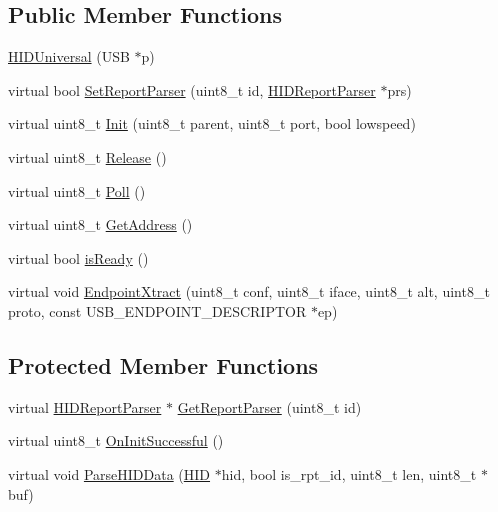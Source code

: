 \subsection*{\-Public \-Member \-Functions}
\begin{DoxyCompactItemize}
\item 
\hyperlink{class_h_i_d_universal_abdbac688c7e4b682055cebd82e13a595}{\-H\-I\-D\-Universal} (\-U\-S\-B $\ast$p)
\item 
virtual bool \hyperlink{class_h_i_d_universal_afbd599879e9c3cdea382e87afd6ab29a}{\-Set\-Report\-Parser} (uint8\-\_\-t id, \hyperlink{class_h_i_d_report_parser}{\-H\-I\-D\-Report\-Parser} $\ast$prs)
\item 
virtual uint8\-\_\-t \hyperlink{class_h_i_d_universal_a384b0e219f763e2d6407636bfd4ccea7}{\-Init} (uint8\-\_\-t parent, uint8\-\_\-t port, bool lowspeed)
\item 
virtual uint8\-\_\-t \hyperlink{class_h_i_d_universal_af999fc50ef4b5dec0391bda79ec83bda}{\-Release} ()
\item 
virtual uint8\-\_\-t \hyperlink{class_h_i_d_universal_ac27e857a0d9619c8abc31be0b690c83c}{\-Poll} ()
\item 
virtual uint8\-\_\-t \hyperlink{class_h_i_d_universal_abcc6921b7beaf0aac2acbcdddd535626}{\-Get\-Address} ()
\item 
virtual bool \hyperlink{class_h_i_d_universal_aa4be95e8f5164393ea4766f68c5b0ea8}{is\-Ready} ()
\item 
virtual void \hyperlink{class_h_i_d_universal_ab9b13f27eca16e0accc14fff9bd318e2}{\-Endpoint\-Xtract} (uint8\-\_\-t conf, uint8\-\_\-t iface, uint8\-\_\-t alt, uint8\-\_\-t proto, const \-U\-S\-B\-\_\-\-E\-N\-D\-P\-O\-I\-N\-T\-\_\-\-D\-E\-S\-C\-R\-I\-P\-T\-O\-R $\ast$ep)
\end{DoxyCompactItemize}
\subsection*{\-Protected \-Member \-Functions}
\begin{DoxyCompactItemize}
\item 
virtual \hyperlink{class_h_i_d_report_parser}{\-H\-I\-D\-Report\-Parser} $\ast$ \hyperlink{class_h_i_d_universal_aff53de37b98aa1e4a6e45be701ddcc65}{\-Get\-Report\-Parser} (uint8\-\_\-t id)
\item 
virtual uint8\-\_\-t \hyperlink{class_h_i_d_universal_a60f06d86767b4b2c973d08383c7a0048}{\-On\-Init\-Successful} ()
\item 
virtual void \hyperlink{class_h_i_d_universal_abac95ce57e678236993d85cbbf0c6c32}{\-Parse\-H\-I\-D\-Data} (\hyperlink{class_h_i_d}{\-H\-I\-D} $\ast$hid, bool is\-\_\-rpt\-\_\-id, uint8\-\_\-t len, uint8\-\_\-t $\ast$buf)
\end{DoxyCompactItemize}
